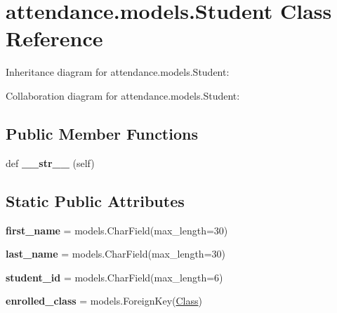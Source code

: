 \hypertarget{classattendance_1_1models_1_1_student}{}\section{attendance.\+models.\+Student Class Reference}
\label{classattendance_1_1models_1_1_student}


Inheritance diagram for attendance.\+models.\+Student\+:


Collaboration diagram for attendance.\+models.\+Student\+:
\subsection*{Public Member Functions}
\begin{DoxyCompactItemize}
\item 
\hypertarget{classattendance_1_1models_1_1_student_a46bf8e078e466826076cb1a4be3defd5}{}\label{classattendance_1_1models_1_1_student_a46bf8e078e466826076cb1a4be3defd5} 
def {\bfseries \+\_\+\+\_\+str\+\_\+\+\_\+} (self)
\end{DoxyCompactItemize}
\subsection*{Static Public Attributes}
\begin{DoxyCompactItemize}
\item 
\hypertarget{classattendance_1_1models_1_1_student_a5317fcb6727810f3eed9ef1b4cc6bbe3}{}\label{classattendance_1_1models_1_1_student_a5317fcb6727810f3eed9ef1b4cc6bbe3} 
{\bfseries first\+\_\+name} = models.\+Char\+Field(max\+\_\+length=30)
\item 
\hypertarget{classattendance_1_1models_1_1_student_a62c0f8588cb2151bb67a1259f69db95a}{}\label{classattendance_1_1models_1_1_student_a62c0f8588cb2151bb67a1259f69db95a} 
{\bfseries last\+\_\+name} = models.\+Char\+Field(max\+\_\+length=30)
\item 
\hypertarget{classattendance_1_1models_1_1_student_a398ca092b10e0f439ca08c3fed80c427}{}\label{classattendance_1_1models_1_1_student_a398ca092b10e0f439ca08c3fed80c427} 
{\bfseries student\+\_\+id} = models.\+Char\+Field(max\+\_\+length=6)
\item 
\hypertarget{classattendance_1_1models_1_1_student_a31e88fa772d289b0f00b0f38df4d478b}{}\label{classattendance_1_1models_1_1_student_a31e88fa772d289b0f00b0f38df4d478b} 
{\bfseries enrolled\+\_\+class} = models.\+Foreign\+Key(\hyperlink{classattendance_1_1models_1_1_class}{Class})
\end{DoxyCompactItemize}


